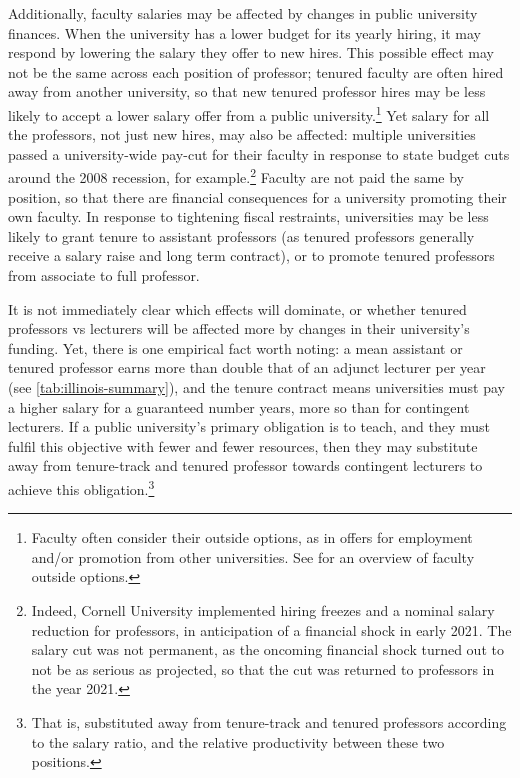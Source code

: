 Additionally, faculty salaries may be affected by changes in public university finances.
When the university has a lower budget for its yearly hiring, it may respond by lowering the salary they offer to new hires.
This possible effect may not be the same across each position of professor; tenured faculty are often hired away from another university, so that new tenured professor hires may be less likely to accept a lower salary offer from a public university.\footnote{
    Faculty often consider their outside options, as in offers for employment and/or promotion from other universities.
    See \cite{blackaby2005} for an overview of faculty outside options.
}
Yet salary for all the professors, not just new hires, may also be affected: multiple universities passed a university-wide pay-cut for their faculty in response to state budget cuts around the 2008 recession, for example.\footnote{
    Indeed, Cornell University implemented hiring freezes and a nominal salary reduction for professors, in anticipation of a financial shock in early 2021.
    The salary cut was not permanent, as the oncoming financial shock turned out to not be as serious as projected, so that the cut was returned to professors in the year 2021.
}
Faculty are not paid the same by position, so that there are financial consequences for a university promoting their own faculty.
In response to tightening fiscal restraints, universities may be less likely to grant tenure to assistant professors (as tenured professors generally receive a salary raise and long term contract), or to promote tenured professors from associate to full professor.



It is not immediately clear which effects will dominate, or whether tenured professors vs lecturers will be affected more by changes in their university's funding.
Yet, there is one empirical fact worth noting: a mean assistant or tenured professor earns more than double that of an adjunct lecturer per year (see \autoref{tab:illinois-summary}), and the tenure contract means universities must pay a higher salary for a guaranteed number years, more so than for contingent lecturers.
If a public university's primary obligation is to teach, and they must fulfil this objective with fewer and fewer resources, then they may substitute away from tenure-track and tenured professor towards contingent lecturers to achieve this obligation.\footnote{
    That is, substituted away from tenure-track and tenured professors according to the salary ratio, and the relative productivity between these two positions.
}
